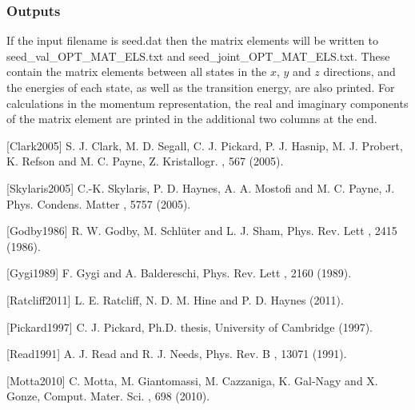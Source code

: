 \documentclass[letterpaper,10pt,english]{sphinxmanual}
\begin{document}
\subsubsection{Outputs}
\label{\detokenize{conduction:outputs}}
If the input filename is seed.dat then the matrix elements will be
written to seed\_val\_OPT\_MAT\_ELS.txt and
seed\_joint\_OPT\_MAT\_ELS.txt. These contain the matrix elements
between all states in the \(x\), \(y\) and \(z\) directions,
and the energies of each state, as well as the transition energy, are
also printed. For calculations in the momentum representation, the real
and imaginary components of the matrix element are printed in the
additional two columns at the end.

{[}Clark2005{]} S. J. Clark, M. D. Segall, C. J. Pickard, P. J. Hasnip, M. J. Probert, K. Refson and M. C. Payne, Z. Kristallogr. , 567 (2005).

{[}Skylaris2005{]} C.-K. Skylaris, P. D. Haynes, A. A. Mostofi and M. C. Payne, J. Phys. Condens. Matter , 5757 (2005).

{[}Godby1986{]} R. W. Godby, M. Schlüter and L. J. Sham, Phys. Rev. Lett , 2415 (1986).

{[}Gygi1989{]} F. Gygi and A. Baldereschi, Phys. Rev. Lett , 2160 (1989).

{[}Ratcliff2011{]} L. E. Ratcliff, N. D. M. Hine and P. D. Haynes  (2011).

{[}Pickard1997{]} C. J. Pickard, Ph.D. thesis, University of Cambridge (1997).

{[}Read1991{]} A. J. Read and R. J. Needs, Phys. Rev. B , 13071 (1991).

{[}Motta2010{]} C. Motta, M. Giantomassi, M. Cazzaniga, K. Gal-Nagy and X. Gonze, Comput. Mater. Sci. , 698 (2010).
\end{document}
